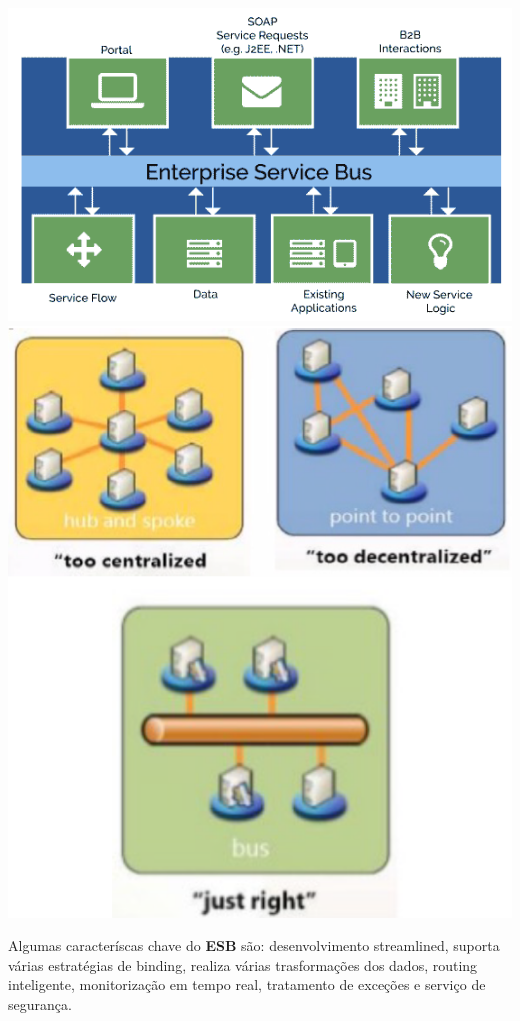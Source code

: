 \documentclass{article}
\begin{document}
\pagebreak

\begin{center}
  \includegraphics[scale=0.4]{67}
  \includegraphics[scale=0.4]{68}
\end{center}

Algumas caracteríscas chave do \textbf{ESB} são:
desenvolvimento streamlined, suporta várias estratégias de binding,
realiza várias trasformações dos dados, routing inteligente, monitorização em
tempo real, tratamento de exceções e serviço de segurança.
\end{document}
